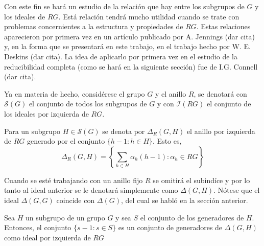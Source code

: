 Con este fin se hará un estudio de la relación que hay entre los subgrupos de $G$ y los ideales de $RG$. Está relación tendrá mucho utilidad cuando se trate con problemas concernientes a la estructura y propiedades de $RG$. Estas relaciones aparecieron por primera vez en un artículo publicado por A. Jennings (dar cita) y, en la forma que se presentará en este trabajo, en el trabajo hecho por W. E. Deskins (dar cita). La idea de aplicarlo por primera vez en el estudio de la reducibilidad completa (como se hará en la siguiente sección) fue de I.G. Connell (dar cita).

Ya en materia de hecho, considérese el grupo $G$ y el anillo $R$, se denotará con $\mathcal{S}(G)$  el conjunto de todos los subgrupos de $G$ y con $\mathcal{I}(RG)$ el conjunto de los ideales por izquierda de $RG$.

\begin{definicion}
Para un subgrupo $H \in \mathcal{S}(G)$ se denota por $\Delta_{R}(G,H)$ el anillo por izquierda de $RG$ generado por el conjunto $\{h-1: h \in H \}$. Esto es, 
\begin{equation}
\Delta_{R}(G,H) = \left\{ \sum_{h \in H} \alpha_h(h-1) : \alpha_h \in RG \right\}
\end{equation}
\end{definicion}

Cuando se esté trabajando con un anillo fijo $R$ se omitirá el subindíce y por lo tanto al ideal anterior se le denotará simplemente como $\Delta(G,H)$. Nótese que el ideal $\Delta(G,G)$ coincide con $\Delta(G)$, del cual se habló en la sección anterior.

\begin{lema}
Sea $H$ un subgrupo de un grupo $G$ y sea $S$ el conjunto de los generadores de $H$. Entonces, el conjunto $\{ s-1 : s \in S \}$ es un conjunto de generadores de $\Delta (G,H) $ como ideal por izquierda de $RG$ 

\end{lema}

